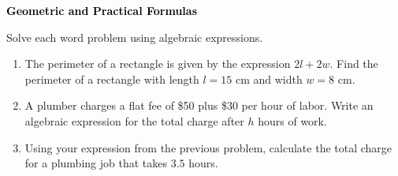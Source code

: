 \documentclass[12pt, letterpaper, fleqn]{article}
\begin{document}
\newpage

\begin{tcolorbox}[colback=black!10]
\large\textcolor{black}{\textbf{Geometric and Practical Formulas}}
\end{tcolorbox}

\noindent
Solve each word problem using algebraic expressions.

\vspace{3mm}

\begin{enumerate}[itemsep=2.2cm, leftmargin=0.6cm]

\item The perimeter of a rectangle is given by the expression $2l + 2w$. Find the perimeter of a rectangle with length $l = 15$ cm and width $w = 8$ cm.

\vspace{2.2cm}

\item A plumber charges a flat fee of \$50 plus \$30 per hour of labor. Write an algebraic expression for the total charge after $h$ hours of work.

\vspace{2.2cm}

\item Using your expression from the previous problem, calculate the total charge for a plumbing job that takes $3.5$ hours.

\vspace{2.2cm}

\end{enumerate}
\end{document}
